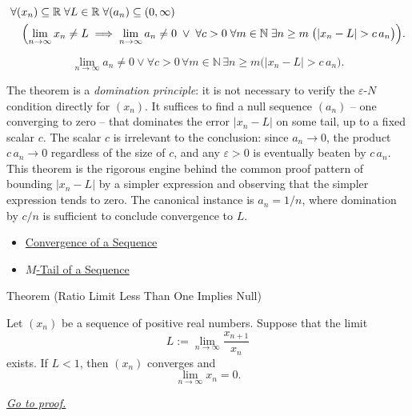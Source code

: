 \begin{remark*}[Interpretation]
\[
\begin{aligned}
&\forall (x_n) \subseteq \mathbb{R} \;\forall L \in \mathbb{R}
 \;\forall (a_n) \subseteq (0,\infty)\\
&\quad\Bigl(
    \lim_{n \to \infty} x_n \neq L
    \;\Longrightarrow\;
    \lim_{n \to \infty} a_n \neq 0
    \;\lor\;
    \forall c > 0 \;\forall m \in \mathbb{N}
    \;\exists n \ge m \;\bigl(|x_n - L| > c\, a_n\bigr)
\Bigr).
\end{aligned}
\]


\[
\lim_{n\to\infty}a_n\neq 0
\lor
\forall c>0\,\forall m\in\mathbb{N}\,\exists n\ge m
\bigl(|x_n-L|>c\,a_n\bigr).
\]


The theorem is a \emph{domination principle}: it is not necessary to
verify the $\varepsilon$-$N$ condition directly for $(x_n)$. It
suffices to find a null sequence $(a_n)$ -- one converging to zero --
that dominates the error $|x_n - L|$ on some tail, up to a fixed
scalar $c$. The scalar $c$ is irrelevant to the conclusion: since
$a_n \to 0$, the product $c\, a_n \to 0$ regardless of the size of
$c$, and any $\varepsilon > 0$ is eventually beaten by $c\, a_n$.
This theorem is the rigorous engine behind the common proof pattern
of bounding $|x_n - L|$ by a simpler expression and observing that
the simpler expression tends to zero. The canonical instance is
$a_n = 1/n$, where domination by $c/n$ is sufficient to conclude
convergence to $L$.
\end{remark*}

\begin{dependencies}
\begin{itemize}
  \item \hyperref[def:convergent-sequence]{Convergence of a Sequence}
  \item \hyperref[def:m-tail]{$M$-Tail of a Sequence}
\end{itemize}
\end{dependencies}



\begin{theorembox}{Theorem (Ratio Limit Less Than One Implies Null)}
\begin{theorem}
\label{thm:ratio-limit-less-than-one-implies-null}

Let $(x_n)$ be a sequence of positive real numbers. Suppose that the
limit
\[
    L := \lim_{n\to\infty}\frac{x_{n+1}}{x_n}
\]
exists. If $L<1$, then $(x_n)$ converges and
\[
    \lim_{n\to\infty} x_n = 0.
\]

\smallskip
\noindent
\hyperref[prf:ratio-limit-less-than-one-implies-null]{\textit{Go to proof.}}
\end{theorem}
\end{theorembox}

